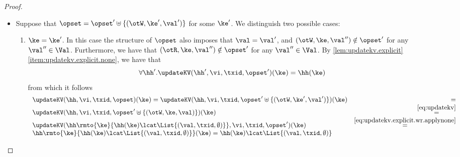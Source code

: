 \begin{proof}
\begin{enumerate}
\begin{itemize}
		\item Suppose that $\opset = \opset' \uplus \{(\otW, \ke', \val')\}$ 
		for some $\ke'$. We distinguish two possible cases:
			\begin{enumerate}
			\item $\ke = \ke'$. In this case the structure of $\opset$ also imposes that $\val = \val'$, 
			and $(\otW, \ke, \val'') \notin \opset'$ for any $\val'' \in \Val$. Furthermore, we have 
			that $(\otR, \ke, \val'') \notin \opset'$ for any $\val'' \in \Val$. 
			By \cref{lem:updatekv.explicit}\eqref{item:updatekv.explicit.none}, we have that 
			\begin{equation}
			\forall \hh'.\updateKV(\hh', \vi, \txid, \opset')(\ke) = \hh(\ke)
			\label{eq:updatekv.explicit.wr.applynone}
			\end{equation}
			from which it follows 
			\[
			\begin{array}{lr}
			\updateKV(\hh, \vi, \txid, \opset)(\ke) = 
			\updateKV(\hh, \vi, \txid, \opset' \uplus \{(\otW, \ke', \val')\})(\ke) &=\\ 
			\updateKV(\hh, \vi, \txid, \opset' \uplus \{(\otW, \ke, \val)\})(\ke) &\stackrel{\eqref{eq:updatekv}}{=}\\
			\updateKV(\hh\rmto{\ke}{\hh(\ke) \lcat \List{(\val, \txid, \emptyset)}}, \vi, \txid, \opset')(\ke) &\stackrel{\eqref{eq:updatekv.explicit.wr.applynone}}{=}\\
			\hh\rmto{\ke}{\hh(\ke) \lcat \List{(\val, \txid, \emptyset)}}(\ke) = \hh(\ke) \lcat \List{(\val, \txid, \emptyset)}
			\end{array}
			\]
			

\end{enumerate}
\end{itemize}
\end{enumerate}
\end{proof}
